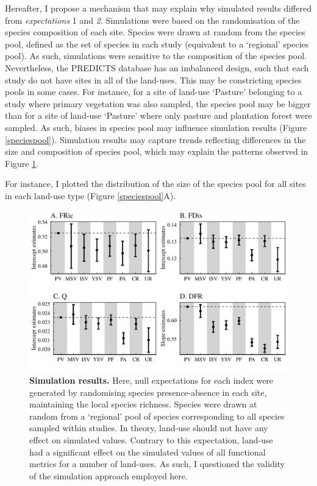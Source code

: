 Hereafter, I propose a mechanism that may explain why simulated results differed from \textit{expectations }1 and \textit{2}. Simulations were based on the randomisation of the species composition of each site. Species were drawn at random from the species pool, defined as the set of species in each study (equivalent to a `regional' species pool). As such, simulations were sensitive to the composition of the species pool. Nevertheless, the PREDICTS database has an imbalanced design, such that each study do not have sites in all of the land-uses. This may be constricting species pools in some cases. For instance, for a site of land-use `Pasture' belonging to a study where primary vegetation was also sampled, the species pool may be bigger than for a site of land-use `Pasture' where only pasture and plantation forest were sampled. As such, biases in species pool may influence simulation results (Figure \ref{speciespool}). Simulation results may capture trends reflecting differences in the size and composition of species pool, which may explain the patterns observed in Figure \ref{simresults}. 

For instance, I plotted the distribution of the size of the species pool for all sites in each land-use type (Figure \ref{speciespool}A). 

\begin{figure}[h!]
\centering
\includegraphics[scale=0.70]{figures/chapter3/Simulations/p_sim}
\caption[Simulation results.]{\textbf{Simulation results.} Here, null expectations for each index were generated by randomising species presence-absence in each site, maintaining the local species richness. Species were drawn at random from a `regional' pool of species corresponding to all species sampled within studies. In theory, land-use should not have any effect on simulated values. Contrary to this expectation, land-use had a significant effect on the simulated values of all functional metrics for a number of land-uses. As such, I questioned the validity of the simulation approach employed here.}
\label{simresults}
\end{figure}

